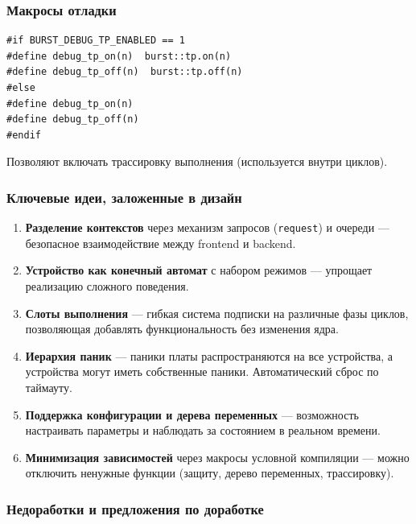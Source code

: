 \documentclass[a4paper,12pt]{article}
\begin{document}
\subsubsection{Макросы отладки}

\begin{lstlisting}
#if BURST_DEBUG_TP_ENABLED == 1
#define debug_tp_on(n)  burst::tp.on(n)
#define debug_tp_off(n)  burst::tp.off(n)
#else
#define debug_tp_on(n)
#define debug_tp_off(n)
#endif
\end{lstlisting}

Позволяют включать трассировку выполнения (используется внутри циклов).

\subsubsection{Ключевые идеи, заложенные в дизайн}

\begin{enumerate}
    \item \textbf{Разделение контекстов} через механизм запросов (\texttt{request}) и очереди — безопасное взаимодействие между frontend и backend.
    \item \textbf{Устройство как конечный автомат} с набором режимов — упрощает реализацию сложного поведения.
    \item \textbf{Слоты выполнения} — гибкая система подписки на различные фазы циклов, позволяющая добавлять функциональность без изменения ядра.
    \item \textbf{Иерархия паник} — паники платы распространяются на все устройства, а устройства могут иметь собственные паники. Автоматический сброс по таймауту.
    \item \textbf{Поддержка конфигурации и дерева переменных} — возможность настраивать параметры и наблюдать за состоянием в реальном времени.
    \item \textbf{Минимизация зависимостей} через макросы условной компиляции — можно отключить ненужные функции (защиту, дерево переменных, трассировку).
\end{enumerate}

\subsubsection{Недоработки и предложения по доработке}
\end{document}
